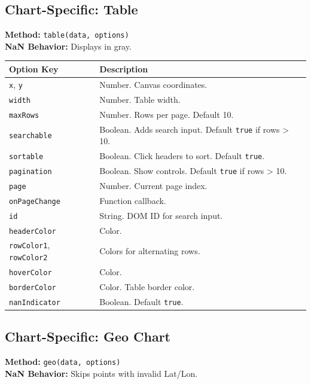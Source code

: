 \documentclass[10pt, a4paper]{article}
\begin{document}
\subsection{Chart-Specific: Table}
\textbf{Method:} \texttt{table(data, options)} \\
\textbf{NaN Behavior:} Displays \texttt{\textemdash} in gray.

\begin{longtable}{p{5cm} p{10cm}}
\toprule
\textbf{Option Key} & \textbf{Description} \\
\midrule
\texttt{x}, \texttt{y} & Number. Canvas coordinates. \\
\texttt{width} & Number. Table width. \\
\texttt{maxRows} & Number. Rows per page. Default 10. \\
\texttt{searchable} & Boolean. Adds search input. Default \texttt{true} if rows > 10. \\
\texttt{sortable} & Boolean. Click headers to sort. Default \texttt{true}. \\
\texttt{pagination} & Boolean. Show controls. Default \texttt{true} if rows > 10. \\
\texttt{page} & Number. Current page index. \\
\texttt{onPageChange} & Function callback. \\
\texttt{id} & String. DOM ID for search input. \\
\texttt{headerColor} & Color. \\
\texttt{rowColor1}, \texttt{rowColor2} & Colors for alternating rows. \\
\texttt{hoverColor} & Color. \\
\texttt{borderColor} & Color. Table border color. \\
\texttt{nanIndicator} & Boolean. Default \texttt{true}. \\
\bottomrule
\end{longtable}

\subsection{Chart-Specific: Geo Chart}
\textbf{Method:} \texttt{geo(data, options)} \\
\textbf{NaN Behavior:} Skips points with invalid Lat/Lon.
\end{document}
